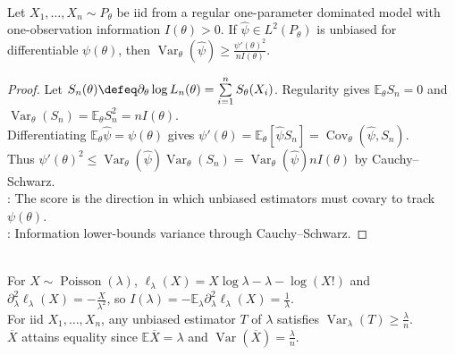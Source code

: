 \begin{theorem} \label{thm:cramer-rao-bound} \\
Let $X_1,\ldots,X_n\sim P_\theta$ be iid from a regular one-parameter dominated model with one-observation information $I(\theta)>0$. If $\widehat{\psi}\in L^2(P_\theta)$ is unbiased for differentiable $\psi(\theta)$, then $\operatorname{Var}_\theta(\widehat{\psi})\geq \frac{\psi'(\theta)^2}{nI(\theta)}$.
\begin{proof}
Let $S_n(\theta)\defeq\partial_\theta\log L_n(\theta)=\sum\limits_{i=1}^{n}S_\theta(X_i)$. Regularity gives $\mathbb{E}_\theta S_n=0$ and $\operatorname{Var}_\theta(S_n)=\mathbb{E}_\theta S_n^2=nI(\theta)$.\\
Differentiating $\mathbb{E}_\theta\widehat{\psi}=\psi(\theta)$ gives $\psi'(\theta)=\mathbb{E}_\theta[\widehat{\psi}S_n]=\operatorname{Cov}_\theta(\widehat{\psi},S_n)$.\\
Thus $\psi'(\theta)^2\leq\operatorname{Var}_\theta(\widehat{\psi})\operatorname{Var}_\theta(S_n)=\operatorname{Var}_\theta(\widehat{\psi})nI(\theta)$ by Cauchy--Schwarz.\\
: The score is the direction in which unbiased estimators must covary to track $\psi(\theta)$.\\
: Information lower-bounds variance through Cauchy--Schwarz.
\end{proof}
\end{theorem}

\begin{example} \label{ex:poisson-cramer-rao-attainment} \\
For $X\sim\operatorname{Poisson}(\lambda)$, $\ell_\lambda(X)=X\log\lambda-\lambda-\log(X!)$ and $\partial_\lambda^2\ell_\lambda(X)=-\frac{X}{\lambda^2}$, so $I(\lambda)=-\mathbb{E}_\lambda\partial_\lambda^2\ell_\lambda(X)=\frac{1}{\lambda}$.\\
For iid $X_1,\ldots,X_n$, any unbiased estimator $T$ of $\lambda$ satisfies $\operatorname{Var}_\lambda(T)\geq\frac{\lambda}{n}$.\\
$\overline{X}$ attains equality since $\mathbb{E}\overline{X}=\lambda$ and $\operatorname{Var}(\overline{X})=\frac{\lambda}{n}$.
\end{example}

